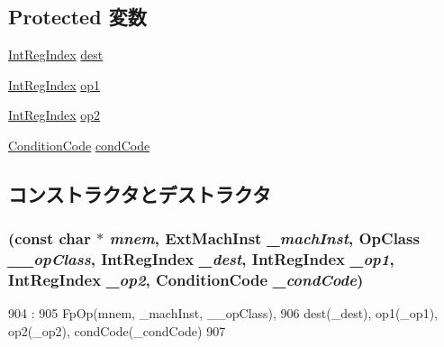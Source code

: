 \subsection*{Protected 変数}
\begin{DoxyCompactItemize}
\item 
\hyperlink{namespaceArmISA_ae64680ba9fb526106829d6bf92fc791b}{IntRegIndex} \hyperlink{classArmISA_1_1FpCondSelOp_aec72e8e45bdc87abeeeb75d2a8a9a716}{dest}
\item 
\hyperlink{namespaceArmISA_ae64680ba9fb526106829d6bf92fc791b}{IntRegIndex} \hyperlink{classArmISA_1_1FpCondSelOp_a4c465c43ad568f8bcf8ae71480e9cfea}{op1}
\item 
\hyperlink{namespaceArmISA_ae64680ba9fb526106829d6bf92fc791b}{IntRegIndex} \hyperlink{classArmISA_1_1FpCondSelOp_a7799ff6cbe5a252199059eb8665820e7}{op2}
\item 
\hyperlink{namespaceArmISA_ab8f08e777c4753720cff841f81da8e06}{ConditionCode} \hyperlink{classArmISA_1_1FpCondSelOp_a273dc0fe84de8f4a9cf52aaf8dc27885}{condCode}
\end{DoxyCompactItemize}


\subsection{コンストラクタとデストラクタ}
\hypertarget{classArmISA_1_1FpCondSelOp_a9058c8be1aa295cfed2c9e8642767101}{
\subsubsection[{FpCondSelOp}]{ (const char $\ast$ {\em mnem}, \/  {\bf ExtMachInst} {\em \_\-machInst}, \/  OpClass {\em \_\-\_\-opClass}, \/  {\bf IntRegIndex} {\em \_\-dest}, \/  {\bf IntRegIndex} {\em \_\-op1}, \/  {\bf IntRegIndex} {\em \_\-op2}, \/  {\bf ConditionCode} {\em \_\-condCode})}}
\label{classArmISA_1_1FpCondSelOp_a9058c8be1aa295cfed2c9e8642767101}



\begin{DoxyCode}
904                                          :
905         FpOp(mnem, _machInst, __opClass),
906         dest(_dest), op1(_op1), op2(_op2), condCode(_condCode)
907     {}

\end{DoxyCode}


